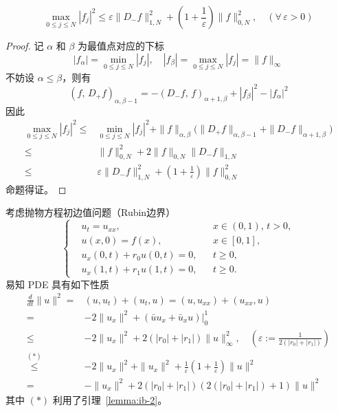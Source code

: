 \begin{lemma}\label{lemma:ib-3}
    \[
        \max_{0 \le j \le N} |f_j|^2 \le \varepsilon \|D_- f\|_{1,N}^2
        + (1 + \frac{1}{\varepsilon}) \|f\|_{0,N}^2,\quad (\forall\,\varepsilon > 0)
    \]
\end{lemma}

\begin{proof}
    记 $\alpha$ 和 $\beta$ 为最值点对应的下标
    \[
        |f_\alpha| = \min_{0 \le j \le N} |f_j|, \quad
        |f_\beta| = \max_{0 \le j \le N} |f_j| = \|f\|_{\infty}
    \]
    不妨设 $\alpha \le \beta$，则有
    \[
        (f,\,D_+ f)_{\alpha,\beta-1} = -(D_-f,\,f)_{\alpha+1,\beta} + |f_\beta|^2 - |f_\alpha|^2
    \]
    因此
    \begin{align*}
        \max_{0 \le j \le N} |f_j|^2 \le{} & \min_{0 \le j \le N} |f_j|^2
        + \|f\|_{\alpha,\beta} \Big( \| D_+ f \|_{\alpha,\beta-1} + \| D_- f \|_{\alpha+1,\beta} \Big)                   \\
        \le{}                              & \|f\|_{0,N}^2 + 2 \|f\|_{0,N} \| D_- f \|_{1,N}                             \\
        \le{}                              & \varepsilon \| D_- f \|_{1,N}^2 + (1 + \frac{1}{\varepsilon}) \|f\|_{0,N}^2
    \end{align*}
    命题得证。
\end{proof}

考虑抛物方程初边值问题（Rubin边界）
\[
    \left\{
    \begin{aligned}
         & u_t = u_{xx},              &  & x \in (0,1),\, t > 0, \\
         & u(x,0) = f(x),             &  & x \in [0,1],          \\
         & u_x(0,t) + r_0 u(0,t) = 0, &  & t \ge 0,              \\
         & u_x(1,t) + r_1 u(1,t) = 0, &  & t \ge 0.
    \end{aligned}
    \right.
\]
易知 PDE 具有如下性质
\begin{align*}
    \frac{d}{dt}\|u\|^2
    ={}                  & (u,u_t) + (u_t,u) = (u,u_{xx}) + (u_{xx},u)
    \\
    ={}                  & -2 \|u_x\|^2 + (\bar{u} u_x + \bar{u}_x u) \big|_0^1
    \\
    \le{}                & -2 \|u_x\|^2 + 2(|r_0|+|r_1|) \|u\|_{\infty}^2,\quad (\varepsilon := \frac{1}{2(|r_0|+|r_1|)})
    \\
    \overset{(*)}{\le}{} & - 2 \|u_x\|^2 + \|u_x\|^2 + \frac{1}{\varepsilon} (1 + \frac{1}{\varepsilon}) \|u\|^2
    \\
    ={}                  & -  \|u_x\|^2 + 2(|r_0|+|r_1|)(2(|r_0|+|r_1|)+1)\|u\|^2
\end{align*}
其中 $(*)$ 利用了引理~\ref{lemma:ib-2}。

